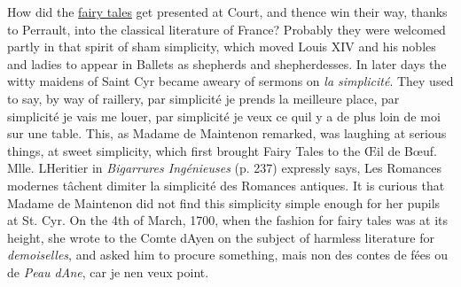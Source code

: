 \documentclass[14pt,a4paper]{memoir}
\newcommand{\ul}[1]{\uline{#1}}
\begin{document}
How did the \ul{fairy tales} get presented at Court, and thence win
their way, thanks to Perrault, into the classical literature of France?
Probably they were welcomed partly in that spirit of sham simplicity,
which moved Louis XIV and his nobles and ladies to appear in Ballets as
shepherds and
shepherdesses.
In later days the witty maidens of Saint Cyr became aweary of sermons on
\emph{la simplicité}. They used to say, by way of raillery,
\textquotesingle par simplicité je prends la meilleure
place,\textquotesingle{} \textquotesingle par simplicité  je vais me louer,\textquotesingle{}
\textquotesingle par simplicité je veux ce qu\textquotesingle il y a de
plus loin de moi sur une table.\textquotesingle{} This, as Madame de
Maintenon remarked, was \textquotesingle laughing at serious
things,\textquotesingle{} at sweet simplicity, which first brought Fairy
Tales to the Œil de
Bœuf.
Mlle. L\textquotesingle Heritier in \emph{Bigarrures Ingénieuses} (p.
237) expressly says, \textquotesingle Les Romances modernes tâchent
d\textquotesingle imiter la simplicité des Romances
antiques.\textquotesingle{} It is curious that Madame de Maintenon did
not find this simplicity simple enough for her pupils at St. Cyr. On the
4th of March, 1700, when the fashion for fairy tales was at its height,
she wrote to the Comte d\textquotesingle Ayen on the subject of harmless
literature for \emph{demoiselles}, and asked him to procure something,
\textquotesingle mais non des contes de fées ou de \emph{Peau
d\textquotesingle Ane}, car je n\textquotesingle en veux
point.\textquotesingle{}
\end{document}
